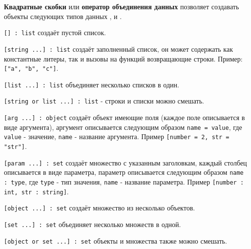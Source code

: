{\bf Квадратные скобки} или {\bf оператор объединения данных} позволяет создавать объекты следующих типов данных \listtype{}, \set{} и \object{}.

\texttt{[] : list} создаёт пустой список.

\texttt{[string ...] : list} создаёт заполненный список, он может содержать как константные литеры, так и вызовы на функций возвращающие строки. Пример: \texttt{["a", "b", "c"]}.

\texttt{[list ...] : list} объединяет несколько списков в один.

\texttt{[string or list ...] : list} - строки и списки можно смешать.

\texttt{[arg ...] : object} создаёт объект имеющие поля (каждое поле описывается в виде аргумента), аргумент описывается следующим образом \texttt{name = value}, где \texttt{value} - значение, \texttt{name} - название аргумента. Пример \texttt{[number = 2, str = "str"]}.

\texttt{[param ...] : set} создаёт множество с указанным заголовкам, каждый столбец описывается в виде параметра, параметр описывается следующим образом \texttt{name : type}, где \texttt{type} - тип значения, \texttt{name} - название параметра. Пример \texttt{[number : int, str : string]}.

\texttt{[object ...] : set} создаёт множество из несколько объектов.

\texttt{[set ...] : set} объединяет несколько множеств в одной.

\texttt{[object or set ...] : set} объекты и множества также можно смешать.

